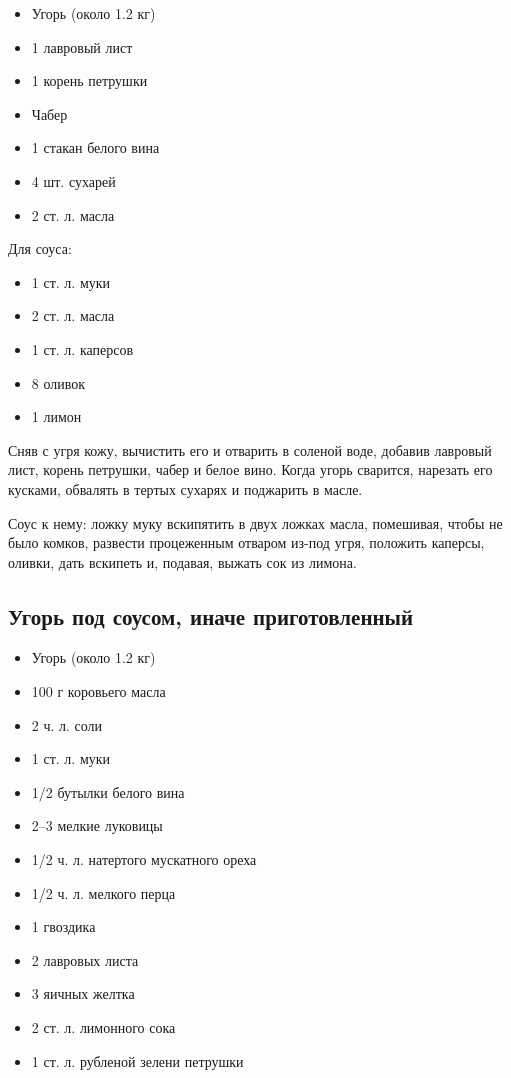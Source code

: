 \begin{itemize}
	\item Угорь (около 1.2 кг) 
    \item 1 лавровый лист 
    \item 1 корень петрушки
    \item Чабер
    \item 1 стакан белого вина
    \item 4 шт. сухарей
    \item 2 ст. л. масла
\end{itemize}

Для соуса: 
\begin{itemize}
	\item 1 ст. л. муки 
    \item 2 ст. л. масла 
    \item 1 ст. л. каперсов 
    \item 8 оливок
    \item 1 лимон
\end{itemize}

Сняв с угря кожу, вычистить его и отварить в соленой воде, добавив лавровый лист, корень петрушки, чабер и белое вино. Когда угорь сварится, нарезать его кусками, обвалять в тертых сухарях и поджарить в масле.

Соус к нему: ложку муку вскипятить в двух ложках масла, помешивая, чтобы не было комков, развести процеженным отваром из-под угря, положить каперсы, оливки, дать вскипеть и, подавая, выжать сок из лимона.

\subsection{Угорь под соусом, иначе приготовленный}

\begin{itemize}
	\item Угорь (около 1.2 кг)
    \item 100 г коровьего масла 
    \item 2 ч. л. соли
    \item 1 ст. л. муки
    \item 1/2 бутылки белого вина
    \item 2–3 мелкие луковицы 
    \item 1/2 ч. л. натертого мускатного ореха 
    \item 1/2 ч. л. мелкого перца
    \item 1 гвоздика 
    \item 2 лавровых листа 
    \item 3 яичных желтка
    \item 2 ст. л. лимонного сока 
    \item 1 ст. л. рубленой зелени петрушки
\end{itemize}

